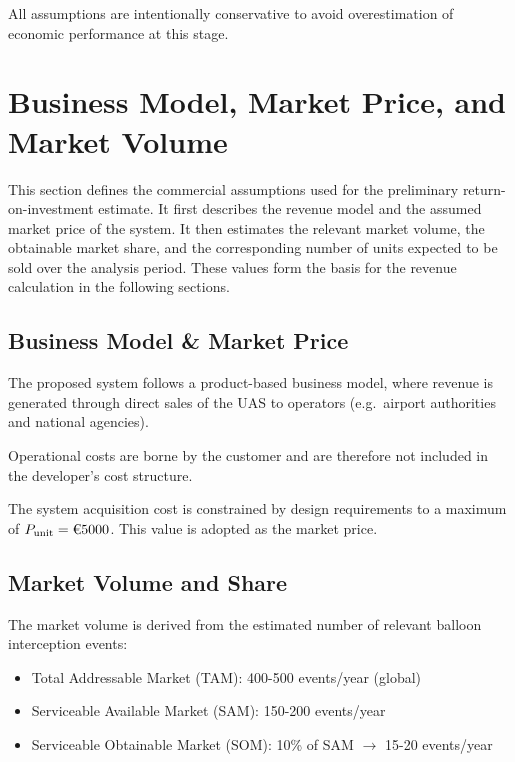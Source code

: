 All assumptions are intentionally conservative to avoid overestimation of economic performance at this stage.
\vspace{-10pt}
\section{Business Model, Market Price, and Market Volume}

This section defines the commercial assumptions used for the preliminary return-on-investment estimate. It first describes the revenue model and the assumed market price of the system. It then estimates the relevant market volume, the obtainable market share, and the corresponding number of units expected to be sold over the analysis period. These values form the basis for the revenue calculation in the following sections.
\vspace{-10pt}
\subsection*{Business Model \& Market Price}

The proposed system follows a product-based business model, where revenue is generated through direct sales of the UAS to operators (e.g.\ airport authorities and national agencies). 

Operational costs are borne by the customer and are therefore not included in the developer's cost structure.

The system acquisition cost is constrained by design requirements to a maximum of $P_{\text{unit}} = \text{\texteuro{}}5000$. This value is adopted as the market price.
\vspace{-10pt}

\subsection*{Market Volume and Share}

The market volume is derived from the estimated number of relevant balloon interception events:

\begin{itemize}[noitemsep, topsep=2pt]
\item Total Addressable Market (TAM): 400-500 events/year (global)
\item Serviceable Available Market (SAM): 150-200 events/year
\item Serviceable Obtainable Market (SOM): 10\% of SAM $\rightarrow$ 15-20 events/year
\end{itemize}

